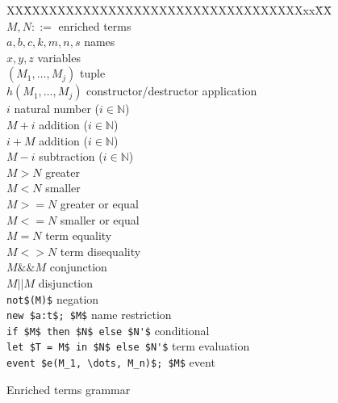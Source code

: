 \documentclass{book}
\begin{document}
%
\begin{figure}[ht]
\begin{center}
\begin{minipage}{\linewidth}
\begin{tabbing}
   XX\=XXXXXXXXXXXXXXXXXXXXXXXXXXXXXXXXXxx\=XX\=\kill     %
$M,N ::=$ \>    				\> enriched terms 		\\
\> $a,b,c,k,m,n,s$					\>\> names					\\
\> $x,y,z$							\>\> variables				\\
\> $(M_1,\dots,M_j)$					\>\> tuple					\\
\> $h(M_1,\dots,M_j)$					\>\> constructor/destructor application\\
\> $i$					\>\> natural number ($i \in \mathbb{N}$)					\\
\> $M + i$							\>\> addition ($i \in \mathbb{N}$)\\
\> $i + M$							\>\> addition ($i \in \mathbb{N}$)\\
\> $M - i$							\>\> subtraction ($i \in \mathbb{N}$)\\
\> $M > N$							\>\> greater \\
\> $M < N$ 							\>\> smaller\\
\> $M >= N$ 							\>\> greater or equal\\
\> $M <= N$ 							\>\> smaller or equal\\
\> $M = N$					\>\> term equality 			\\
\> $M \mathrel{<>} N$						\>\> term disequality 		\\
\> $M \mathrel{\&\&} M$                        \>\> conjunction			\\
\> $M \mathrel{||} M$                		\>\> disjunction			\\
\> \lstinline!not$(M)$!                       \>\> negation				\\
\> \lstinline!new $a:t$; $M$!		\>\> name restriction\\
\> \lstinline!if $M$ then $N$ else $N'$!			\>\> conditional\\
\> \lstinline!let $T = M$ in $N$ else $N'$!			\>\> term evaluation \\
\> \lstinline!event $e(M_1, \dots, M_n)$; $M$! \>\> event
\end{tabbing}
\end{minipage}
\end{center}
\caption{Enriched terms grammar}
\label{fig:enriched}
\end{figure}
\end{document}
